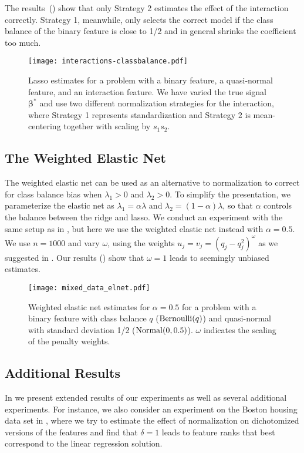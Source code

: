 The results~() show that only Strategy 2 estimates the effect of the
interaction correctly. Strategy 1, meanwhile, only selects the correct model if the class
balance of the binary feature is close to 1/2 and in general shrinks the coefficient too
much.

\begin{figure}[htpb]
  \centering
  \texttt{[image: interactions-classbalance.pdf]}
  \caption{%
    Lasso estimates for a problem with a binary feature, a quasi-normal
    feature, and an interaction feature. We have varied the true signal
    \(\bm{\beta}^*\) and use two different normalization strategies for the
    interaction, where
    Strategy 1 represents standardization and Strategy 2 is mean-centering
    together with scaling by \(s_1 s_2\).
  }
  \label{fig:interactions}
\end{figure}

\subsection{The Weighted Elastic Net}

The weighted elastic net can be used as an alternative to normalization to correct for
class balance bias when \(\lambda_1 > 0\) and \(\lambda_2 >0\). To simplify the
presentation, we parameterize the elastic net as \(\lambda_1 = \alpha \lambda \) and
\(\lambda_2 = (1-\alpha) \lambda\), so that \(\alpha\) controls the balance between the
ridge and lasso. We conduct an experiment with the same setup as in
, but here we use the weighted elastic net instead with
\(\alpha = 0.5\). We use \(n=1000\) and vary \(\omega\), using the weights \(u_j = v_j =
(q_j - q_j^2)^{\omega}\) as we suggested in . Our results
() show that \(\omega = 1\) leads to seemingly unbiased
estimates.

\begin{figure}[htpb]
  \centering
  \texttt{[image: mixed\_data\_elnet.pdf]}
  \caption{%
    Weighted elastic net estimates for \(\alpha = 0.5\) for a problem with a binary
    feature with class balance \(q\) (\(\operatorname{Bernoulli}(q)\)) and quasi-normal
    with standard deviation 1/2 (\(\operatorname{Normal}(0, 0.5)\)). \(\omega\) indicates
    the scaling of the penalty weights.
  }
  \label{fig:mixed-data-elnet}
\end{figure}

\subsection{Additional Results}

In  we present extended results of our experiments as well
as several additional experiments. For instance, we also consider an experiment on the
Boston housing data set in , where we try to estimate the effect
of normalization on dichotomized versions of the features and find that \(\delta = 1\)
leads to feature ranks that best correspond to the linear regression solution.
